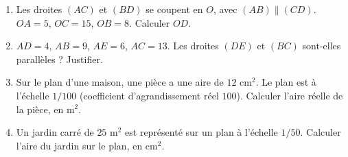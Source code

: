 \begin{enumerate}[label=\arabic*)]
\item Les droites $(AC)$ et $(BD)$ se coupent en $O$, avec $(AB)\parallel(CD)$. $OA=5$,
$OC=15$, $OB=8$. Calculer $OD$.
\item $AD=4$, $AB=9$, $AE=6$, $AC=13$. Les droites $(DE)$ et $(BC)$ sont-elles
parallèles ? Justifier.
\item Sur le plan d'une maison, une pièce a une aire de $12\text{ cm}^2$. Le plan est à
l'échelle $1/100$ (coefficient d'agrandissement réel $100$). Calculer l'aire réelle de la
pièce, en $\text{m}^2$.
\item Un jardin carré de $25\text{ m}^2$ est représenté sur un plan à l'échelle $1/50$.
Calculer l'aire du jardin sur le plan, en $\text{cm}^2$.
\end{enumerate}

